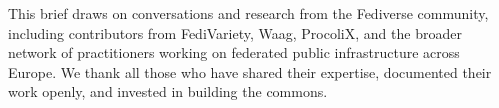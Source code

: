This brief draws on conversations and research from the Fediverse community, including contributors from FediVariety, Waag, ProcoliX, and the broader network of practitioners working on federated public infrastructure across Europe. We thank all those who have shared their expertise, documented their work openly, and invested in building the commons.